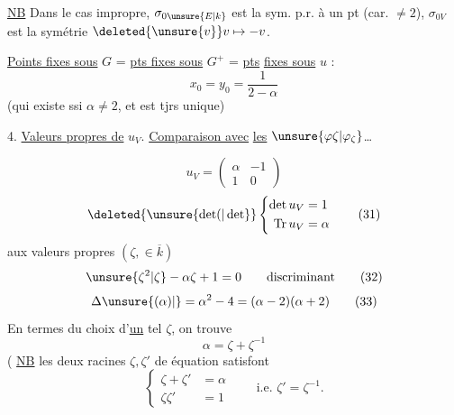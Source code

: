 \uline{NB} Dans le cas impropre, $\sigma_{0\unsure{E|k}}$ est la sym. p.r. à
un pt (car. $\ne2$), $\sigma_{0V}$ est la symétrie $\deleted{\unsure{v}}v\mapsto-v$.

\uline{Points fixes sous} $G$ = \uline{pts fixes sous} $G^+$ = \uline{pts}
\uline{fixes sous} $u$ :
\[ x_0=y_0=\frac{1}{2-\alpha} \tag*{(29)} \]
(qui existe ssi $\alpha\ne2$, et est tjrs unique)

4. \uline{Valeurs propres de} $u_V$. \uline{Comparaison avec}
\uline{les} $\unsure{\varphi\zeta|\varphi_\zeta}$\ldots

\[ u_V=\begin{pmatrix}\alpha&-1\\1&0\end{pmatrix} \tag*{(30)} \]
\[ \deleted{\unsure{\det(|\det}} \left\{\begin{aligned}\det u_V&=1\\
\operatorname{Tr} u_V&=\alpha\end{aligned}\right. \tag*{(31)} \]
 aux valeurs propres $(\zeta,\in\overline{k})$
\[ \unsure{\zeta^2|\zeta}-\alpha\zeta+1=0\qquad\text{discriminant} \tag*{(32)} \]
\[ \Delta\unsure{(\alpha)|{}}=\alpha^2-4=(\alpha-2)(\alpha+2) \tag*{(33)} \]
En termes du choix d'\uline{un} tel $\zeta$, on
trouve
\[ \alpha=\zeta+\zeta^{-1} \tag*{(33)} \]
( \uline{NB} les deux racines $\zeta,\zeta'$ de  équation
satisfont
\[ \left\{\begin{aligned}\zeta+\zeta'&=\alpha\\
\zeta\zeta'&=1\end{aligned}\right.\qquad\text{i.e. }\zeta'=\zeta^{-1}. \tag*{(34)} \]

